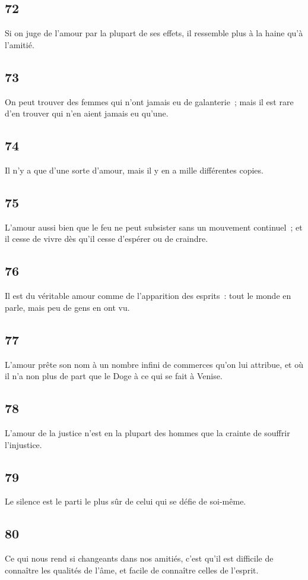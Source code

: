 \documentclass[french,twoside]{book} %
\begin{document}
\subsection[{72}]{ \textsc{72} }
\noindent Si on juge de l’amour par la plupart de ses effets, il ressemble plus à la haine qu’à l’amitié.
\subsection[{73}]{ \textsc{73} }
\noindent On peut trouver des femmes qui n’ont jamais eu de galanterie ; mais il est rare d’en trouver qui n’en aient jamais eu qu’une.
\subsection[{74}]{ \textsc{74} }
\noindent Il n’y a que d’une sorte d’amour, mais il y en a mille différentes copies.
\subsection[{75}]{ \textsc{75} }
\noindent L’amour aussi bien que le feu ne peut subsister sans un mouvement continuel ; et il cesse de vivre dès qu’il cesse d’espérer ou de craindre.
\subsection[{76}]{ \textsc{76} }
\noindent Il est du véritable amour comme de l’apparition des esprits : tout le monde en parle, mais peu de gens en ont vu.
\subsection[{77}]{ \textsc{77} }
\noindent L’amour prête son nom à un nombre infini de commerces qu’on lui attribue, et où il n’a non plus de part que le Doge à ce qui se fait à Venise.
\subsection[{78}]{ \textsc{78} }
\noindent L’amour de la justice n’est en la plupart des hommes que la crainte de souffrir l’injustice.
\subsection[{79}]{ \textsc{79} }
\noindent Le silence est le parti le plus sûr de celui qui se défie de soi-même.
\subsection[{80}]{ \textsc{80} }
\noindent Ce qui nous rend si changeants dans nos amitiés, c’est qu’il est difficile de connaître les qualités de l’âme, et facile de connaître celles de l’esprit.
\end{document}
